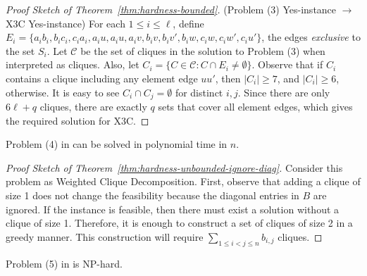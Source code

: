 \begin{proof}[Proof Sketch of Theorem~\ref{thm:hardness-bounded}]
  (Problem (3) Yes-instance $\to$ X3C Yes-instance)
  For each $1 \leq i \leq \ell$, define\newline
  $E_i=\{a_ib_i, b_ic_i, c_ia_i, a_iu, a_iu, a_iv, b_iv, b_iv', b_iw, c_iw, c_iw', c_iu'\}$, the edges \textit{exclusive} to the set $S_i$.
  Let $\mathcal{C}$ be the set of cliques in the solution to Problem (3) when interpreted as cliques.
  Also, let $C_i=\{C \in \mathcal{C}: C \cap E_i \neq \emptyset\}$.
  Observe that if $C_i$ contains a clique including any element edge $uu'$, then $|C_i|\geq 7$,
  and $|C_i|\geq 6$, otherwise. It is easy to see $C_i \cap C_j=\emptyset$ for distinct $i,j$.
  Since there are only $6\ell + q$ cliques, there are exactly $q$ sets that cover all element edges,
  which gives the required solution for X3C.
\end{proof}

\begin{thm}\label{thm:hardness-unbounded-ignore-diag}
  Problem (4) in  can be solved in polynomial time in $n$.
\end{thm}

\begin{proof}[Proof Sketch of Theorem~\ref{thm:hardness-unbounded-ignore-diag}]
  Consider this problem as Weighted Clique Decomposition.
  First, observe that adding a clique of size 1 does not change the feasibility
  because the diagonal entries in $B$ are ignored.
  If the instance is feasible, then there must exist a solution without a clique of size 1.
  Therefore, it is enough to construct a set of cliques of size 2 in a greedy manner.
  This construction will require $\sum_{1 \leq i < j \leq n}b_{i,j}$ cliques.
\end{proof}

\begin{thm}\label{thm:hardness-unbounded}
  Problem (5) in  is NP-hard.
\end{thm}

